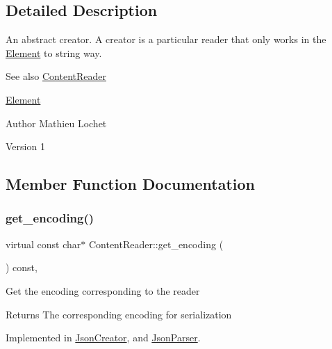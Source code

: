 \subsection{Detailed Description}
An abstract creator. A creator is a particular reader that only works in the \mbox{\hyperlink{classElement}{Element}} to string way. \begin{DoxySeeAlso}{See also}
\mbox{\hyperlink{classContentReader}{Content\+Reader}} 

\mbox{\hyperlink{classElement}{Element}}
\end{DoxySeeAlso}
\begin{DoxyAuthor}{Author}
Mathieu Lochet 
\end{DoxyAuthor}
\begin{DoxyVersion}{Version}
1 
\end{DoxyVersion}


\subsection{Member Function Documentation}
\mbox{\label{classContentReader_a1495a4402c4fac02d8cd2542b61c6eed}} 
\subsubsection{\texorpdfstring{get\+\_\+encoding()}{get\_encoding()}}
{\footnotesize\ttfamily virtual const char$\ast$ Content\+Reader\+::get\+\_\+encoding (\begin{DoxyParamCaption}{ }\end{DoxyParamCaption}) const\hspace{0.3cm}{\ttfamily [pure virtual]}, {\ttfamily [inherited]}}

Get the encoding corresponding to the reader

\begin{DoxyReturn}{Returns}
The corresponding encoding for serialization 
\end{DoxyReturn}


Implemented in \mbox{\hyperlink{classJsonCreator_ab7313de0040d40a26a9386eb3714120c}{Json\+Creator}}, and \mbox{\hyperlink{classJsonParser_a449d410175c5055eb171f00105305ec5}{Json\+Parser}}.

\mbox{\label{classContentReader_a7fff2e63a2e8fa216665604f69974e1d}} 
